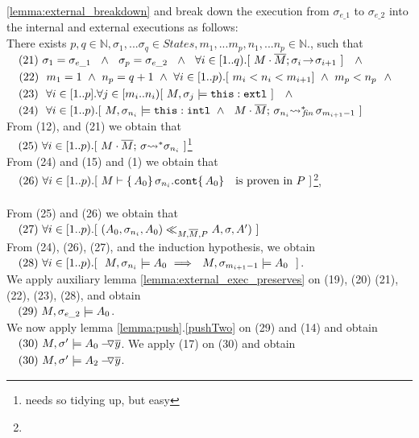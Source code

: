 \begin{description}
\ref{lemma:external_breakdown} and break down the execution from $\sigma_{e\_1}$ to  $\sigma_{e\_2}$ into the internal and external executions as follows:
\\
There exists $ p,q\in \mathbb{N},  \sigma_1, ... \sigma_q \in States, m_1,...m_p, n_1, ... n_p \in \mathbb{N}.$, such that \\ 
$\ \strut \ \ (21) \ \sigma_1=\sigma_{e\_1} \ \ \wedge\ \  \sigma_p=\sigma_{e\_2}\ \  \wedge\ \ \forall i\in [1..q).[\   \leadstoOrig {M\cdot \Mtwo}  {\sigma_i}  {\sigma_{i+1}}\  ] \  \ \ \wedge$\\
$\ \strut \ \ (22) \ \ m_1=1 \ \wedge\ n_p=q+1 \  \wedge\ \forall i\in[1..p).[  \  m_i < n_i < m_{i+1}  ] \ \wedge \ m_p<n_p\ \ \wedge  $\\
$\ \strut \ \ (23) \ \ \forall i\in[1..p].\forall j\in [m_i..n_i)[\   M,\sigma_j \models \external {\texttt{this}} \ ] \  \ \ \wedge$\\
$\ \strut \ \ (24) \ \ \forall i\in[1..p). [ \ M,\sigma_{n_i} \models \internal {\texttt{this}}   \ \wedge \ \ 
 \leadstoBoundedStarFin {M\cdot \Mtwo}  {\sigma_{n_{i}}}  {\sigma_{m_{i+1}-1}} \ ] $ \\
From (12), and (21) we obtain that\\
$\ \strut \ \ (25)\   \forall i\in[1..p). [ \ \leadstoBoundedStar {M\cdot \Mtwo}  {\sigma} {\sigma_{n_{i}}} \ ]$\footnote{needs so tidying up, but easy}
\\
From  (24) and (15) and (1) we obtain that\\
$\ \strut \ \ (26)\ \forall i\in[1..p). [ \ M\vdash \{ \, A_0  \}\, {\sigma_{n_{i}}.\prg{cont}}  \{ \, A_0 \}\ \  \mbox{ is proven in } P \ ]$\footnote{}, \\
\\
From (25) and (26) we obtain that\\
$\ \strut \ \ (27)\   \forall i\in[1..p).[ \ ( A_0, \sigma_{n_{i}}, A_0 ) \ll_{M,\Mtwo,P}  A, \sigma, A' )\ ]$
\\
From (24), (26), (27), and the induction hypothesis, we obtain\\
$\ \strut \ \ (28)\    \forall i\in[1..p).[ \ \  M, \sigma_{n_{i}} \models A_0 \ \Longrightarrow \ \ M, \sigma_{m_{i+1}-1} \models A_0 \ \ ]$.\\
We apply auxiliary lemma \ref{lemma:external_exec_preserves} on (19), (20) (21), (22), (23), (28), and obtain\\
$\ \strut \ \ (29) \   M, \sigma_{e\_2} \models A_0$.\\
We now apply lemma \ref{lemma:push}.\ref{pushTwo} on (29) and  (14) and obtain\\
$\ \strut \ \ (30) \   M, \sigma'  \models \PushAS  {y}{A_0}$.
We apply (17) on (30) and obtain\\
$\ \strut \ \ (30) \   M, \sigma'  \models \PushAS  {y}{A_2}$.
\end{description}
